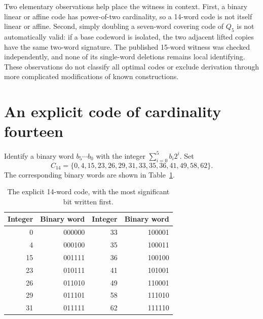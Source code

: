 \documentclass[11pt]{article}
\newcommand{\code}{C_{14}}
\begin{document}
Two elementary observations help place the witness in context. First, a binary linear or affine code has power-of-two cardinality, so a 14-word code is not itself linear or affine. Second, simply doubling a seven-word covering code of $Q_5$ is not automatically valid: if a base codeword is isolated, the two adjacent lifted copies have the same two-word signature. The published 15-word witness was checked independently, and none of its single-word deletions remains local identifying. These observations do not classify all optimal codes or exclude derivation through more complicated modifications of known constructions.

\section{An explicit code of cardinality fourteen}\label{sec:witness}
Identify a binary word $b_5\cdots b_0$ with the integer $\sum_{i=0}^5 b_i2^i$. Set
\begin{equation}\label{eq:witness}
 \code=\{0,4,15,23,26,29,31,33,35,36,41,49,58,62\}.
\end{equation}
The corresponding binary words are shown in Table~\ref{tab:witness}.
\begin{table}[ht]
\centering
\begin{tabular}{rr@{\qquad}rr}
\toprule
Integer & Binary word & Integer & Binary word\\\midrule
0&000000&33&100001\\
4&000100&35&100011\\
15&001111&36&100100\\
23&010111&41&101001\\
26&011010&49&110001\\
29&011101&58&111010\\
31&011111&62&111110\\\bottomrule
\end{tabular}
\caption{The explicit 14-word code, with the most significant bit written first.}\label{tab:witness}
\end{table}
\end{document}
